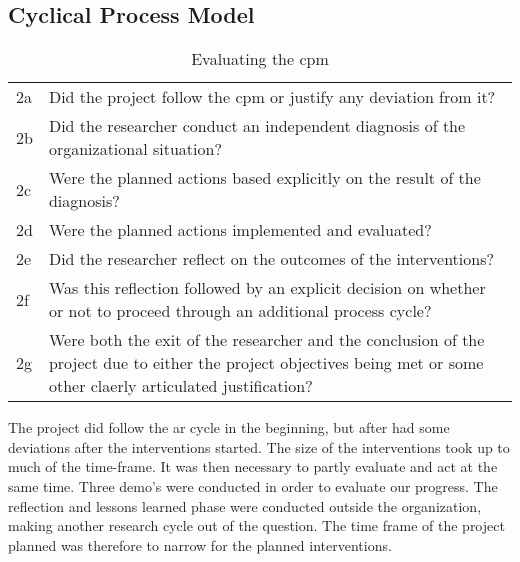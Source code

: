 \subsection{Cyclical Process Model}
\begin{table}[h]
\centering 
\begin{tabular}{p{2cm} p{8cm}}
\hline
2a & Did the project follow the \gls{cpm} or justify any deviation from it? \\
2b & Did the researcher conduct an independent diagnosis of the organizational situation? \\
2c & Were the planned actions based explicitly on the result of the diagnosis? \\
2d & Were the planned actions implemented and evaluated? \\
2e & Did the researcher reflect on the outcomes of the interventions? \\
2f & Was this reflection followed by an explicit decision on whether or not to proceed through an additional process cycle? \\
2g & Were both the exit of the researcher and the conclusion of the project due to either the project objectives being met or some other claerly articulated justification? \\
\hline
\end{tabular}
\caption{Evaluating the \gls{cpm}}
\label{tab:evacpm}
\end{table}
The project did follow the \gls{ar} cycle in the beginning, but after had some deviations after the interventions started.
The size of the interventions took up to much of the time-frame. 
It was then necessary to partly evaluate and act at the same time. Three demo's were conducted in order to evaluate our progress. 
The reflection and lessons learned phase were conducted outside the organization, making another research cycle out of the question.
The time frame of the project planned was therefore to narrow for the planned interventions. 
\newpage

